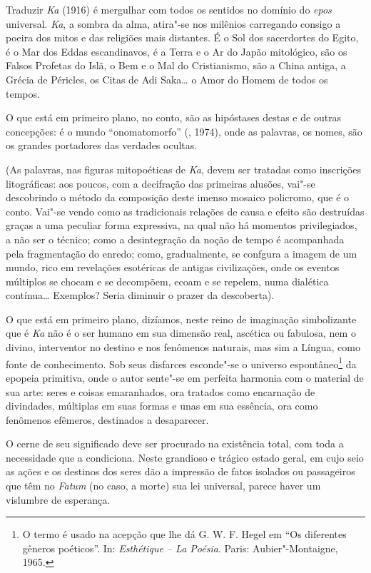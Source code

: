 {Traduzir \emph{Ka} (1916) é mergulhar com todos os sentidos no domínio
do \emph{epos} universal. \emph{Ka}, a sombra da alma, atira"-se nos
milênios carregando consigo a poeira dos mitos e das religiões mais
distantes. É o Sol dos sacerdortes do Egito, é o Mar dos Eddas
escandinavos, é a Terra e o Ar do Japão mitológico, são os Falsos
Profetas do Islã, o Bem e o Mal do Cristianismo, são a China antiga, a
Grécia de Péricles, os Citas de Adi Saka\ldots{} o Amor do Homem de todos os
tempos.

O que está em primeiro plano, no conto, são as hipóstases destas e de
outras concepções: é o mundo ``onomatomorfo'' (, 1974), onde as
palavras, os nomes, são os grandes portadores das verdades ocultas.

(As palavras, nas figuras mitopoéticas de \emph{Ka}, devem ser tratadas
como inscrições litográficas: aos poucos, com a decifração das primeiras
alusões, vai"-se descobrindo o método da composição deste imenso mosaico
policromo, que é o conto. Vai"-se vendo como as tradicionais relações de
causa e efeito são destruídas graças a uma peculiar forma expressiva, na
qual não há momentos privilegiados, a não ser o técnico; como a
desintegração da noção de tempo é acompanhada pela fragmentação do
enredo; como, gradualmente, se confgura a imagem de um mundo, rico em
revelações esotéricas de antigas civilizações, onde os eventos múltiplos
se chocam e se decompõem, ecoam e se repelem, numa dialética contínua\ldots{}
Exemplos? Seria diminuir o prazer da descoberta).

O que está em primeiro plano, dizíamos, neste reino de imaginação
simbolizante que é \emph{Ka} não é o ser humano em sua dimensão real,
ascética ou fabulosa, nem o divino, interventor no destino e nos
fenômenos naturais, mas sim a Língua, como fonte de conhecimento. Sob
seus disfarces esconde"-se o universo espontâneo\footnote{O termo é usado
  na acepção que lhe dá G. W. F. Hegel em ``Os diferentes gêneros
  poéticos''. In: \emph{Esthétique -- La Poésia}. Paris: Aubier"-Montaigne,
  1965.} da epopeia primitiva, onde o autor sente"-se em perfeita
harmonia com o material de sua arte: seres e coisas emaranhados, ora
tratados como encarnação de divindades, múltiplas em suas formas e unas
em sua essência, ora como fenômenos efêmeros, destinados a desaparecer.

O cerne de seu significado deve ser procurado na existência total, com
toda a necessidade que a condiciona. Neste grandioso e trágico estado
geral, em cujo seio as ações e os destinos dos seres dão a impressão de
fatos isolados ou passageiros que têm no \emph{Fatum} (no caso, a morte)
sua lei universal, parece haver um vislumbre de esperança.

}
